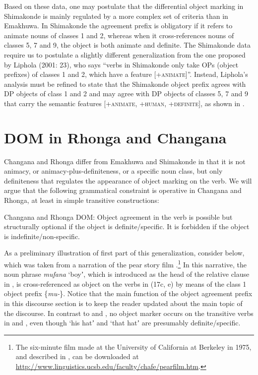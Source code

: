 \documentclass[output=paper]{langsci/langscibook}
\begin{document}
{Based on these data, one may postulate that the differential object mar}{king in Shimakonde is mainly regulated by a more complex set of criteria than in }{Emakhuwa}{. In Shimakonde the agreement prefix is obligatory if it refers to animate nouns of classes 1 and 2, whereas when it cross-references nouns of classes 5, 7 and 9, the object is both animate and definite. }{The Shimakonde data require us to postulate a slightly different generalization from the one proposed by Liphola (2001}{: 23), who says “verbs in Shimakonde only take OPs (object prefixes) of classes 1 and 2, which have a feature [+}{\textsc{animate}}{]”. Instead, Liphola’s analysis must be refined to state that the Shimakonde object prefix agrees with DP objects of class 1 and 2 and may agree with DP objects of classes 5, 7 and 9 that carry the semantic features }{\textsc{[+animate, +human, +definite], }} as shown in .

\section{DOM in Rhonga and Changana}\label{sec:nguna:4}

Changana and Rhonga differ from Emakhuwa and Shimakonde in that it is not animacy, or animacy-plus-definiteness, or a specific noun class, but only definiteness that regulates the appearance of object marking on the verb. We will argue that the following grammatical constraint is operative in Changana and Rhonga, at least in simple transitive constructions:

\ea
{Changana and Rhonga DOM: Object agreement in the verb is possible but structurally optional if the object is definite/specific. It is forbidden if the object is indefinite/non-specific.}
\z

{As a preliminary illustration of first part of this generalization, consider } {below, which was taken from a narration of the pear story film \citep{Chafe1980}.}\footnote{ {The six-minute film made at the University of California at Berkeley in 1975, and described in \citet{Chafe1980}, can be downloaded at }\url{http://www.linguistics.ucsb.edu/faculty/chafe/pearfilm.htm}.} {In this narrative, the noun phrase }{\textit{mufana}} {‘boyʼ, which is introduced as the head of the relative clause in , is cross-referenced as object on the verbs in (17c, e) by means of the class 1 object prefix \{}{\textit{mu-}}{\}. Notice that the main function of the object agreement prefix in this discourse section is to keep the reader updated about the} {}{main topic of the discourse. In contrast to  and , no object marker occurs on the transitive verbs in  and , even though ‘his hatʼ  and ‘that hatʼ  are presumably definite/specific.}
\end{document}
